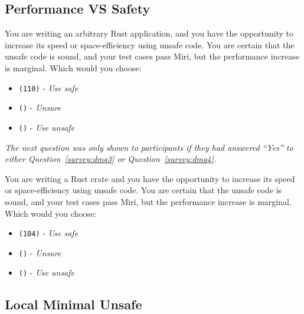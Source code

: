 \subsection{Performance VS Safety}
\label{survey:sec:pvsq}

\begin{protocol}
\item \label{survey:pvsq1}  You are writing an arbitrary Rust application, and you have the opportunity to increase its speed or space-efficiency using unsafe code. You are certain that the unsafe code is sound, and your test cases pass Miri, but the performance increase is marginal. Which would you choose:
\begin{itemize}
\item \texttt{(110)} - \textit{Use safe}
\item \texttt{()} - \textit{Unsure}
\item \texttt{()} - \textit{Use unsafe}
\end{itemize}
\end{protocol}

\noindent \textit{The next question was only shown to participants if they had answered ``\textit{Yes}'' to either Question~\ref{survey:dmq3} or Question~\ref{survey:dmq4}.}
\begin{protocol}
\setcounter{protocoli}{1}
\item \label{survey:pvsq2}  You are writing a Rust crate and you have the opportunity to increase its speed or space-efficiency using unsafe code. You are certain that the unsafe code is sound, and your test cases pass Miri, but the performance increase is marginal. Which would you choose:
\begin{itemize}
\item \texttt{(104)} - \textit{Use safe}
\item \texttt{()} - \textit{Unsure}
\item \texttt{()} - \textit{Use unsafe}
\end{itemize}
\end{protocol}

\subsection{Local Minimal Unsafe}
\label{survey:sec:lmuq}

